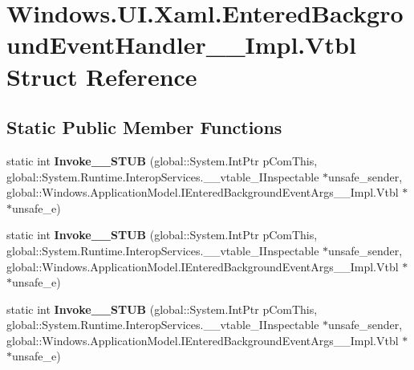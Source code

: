 \hypertarget{struct_windows_1_1_u_i_1_1_xaml_1_1_entered_background_event_handler_____impl_1_1_vtbl}{}\section{Windows.\+U\+I.\+Xaml.\+Entered\+Background\+Event\+Handler\+\_\+\+\_\+\+Impl.\+Vtbl Struct Reference}
\label{struct_windows_1_1_u_i_1_1_xaml_1_1_entered_background_event_handler_____impl_1_1_vtbl}
\subsection*{Static Public Member Functions}
\begin{DoxyCompactItemize}
\item 
\mbox{\label{struct_windows_1_1_u_i_1_1_xaml_1_1_entered_background_event_handler_____impl_1_1_vtbl_a1659763921fbfd8fd9cf1950cdb129a9}} 
static int {\bfseries Invoke\+\_\+\+\_\+\+S\+T\+UB} (global\+::\+System.\+Int\+Ptr p\+Com\+This, global\+::\+System.\+Runtime.\+Interop\+Services.\+\_\+\+\_\+vtable\+\_\+\+I\+Inspectable $\ast$unsafe\+\_\+sender, global\+::\+Windows.\+Application\+Model.\+I\+Entered\+Background\+Event\+Args\+\_\+\+\_\+\+Impl.\+Vtbl $\ast$$\ast$unsafe\+\_\+e)
\item 
\mbox{\label{struct_windows_1_1_u_i_1_1_xaml_1_1_entered_background_event_handler_____impl_1_1_vtbl_a1659763921fbfd8fd9cf1950cdb129a9}} 
static int {\bfseries Invoke\+\_\+\+\_\+\+S\+T\+UB} (global\+::\+System.\+Int\+Ptr p\+Com\+This, global\+::\+System.\+Runtime.\+Interop\+Services.\+\_\+\+\_\+vtable\+\_\+\+I\+Inspectable $\ast$unsafe\+\_\+sender, global\+::\+Windows.\+Application\+Model.\+I\+Entered\+Background\+Event\+Args\+\_\+\+\_\+\+Impl.\+Vtbl $\ast$$\ast$unsafe\+\_\+e)
\item 
\mbox{\label{struct_windows_1_1_u_i_1_1_xaml_1_1_entered_background_event_handler_____impl_1_1_vtbl_a1659763921fbfd8fd9cf1950cdb129a9}} 
static int {\bfseries Invoke\+\_\+\+\_\+\+S\+T\+UB} (global\+::\+System.\+Int\+Ptr p\+Com\+This, global\+::\+System.\+Runtime.\+Interop\+Services.\+\_\+\+\_\+vtable\+\_\+\+I\+Inspectable $\ast$unsafe\+\_\+sender, global\+::\+Windows.\+Application\+Model.\+I\+Entered\+Background\+Event\+Args\+\_\+\+\_\+\+Impl.\+Vtbl $\ast$$\ast$unsafe\+\_\+e)
$$
\end{DoxyCompactItemize}
